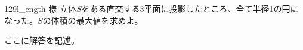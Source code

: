 \begin{prob}{129}{}{l\_ength 様}
 立体$S$をある直交する3平面に投影したところ、全て半径1の円になった。$S$の体積の最大値を求めよ。
\end{prob}
ここに解答を記述。